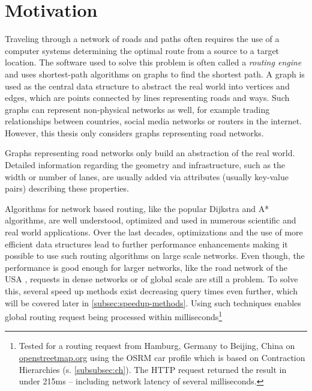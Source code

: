 
\section{Motivation}
	
	Traveling through a network of roads and paths often requires the use of a computer systems determining the optimal route from a source to a target location.
	The software used to solve this problem is often called a \emph{routing engine} and uses shortest-path algorithms on graphs to find the shortest path.
	A graph is used as the central data structure to abstract the real world into vertices and edges, which are points connected by lines representing roads and ways.
	Such graphs can represent non-physical networks as well, for example trading relationships between countries, social media networks or routers in the internet.
	However, this thesis only considers graphs representing road networks.
	
	Graphs representing road networks only build an abstraction of the real world.
	Detailed information regarding the geometry and infrastructure, such as the width or number of lanes, are usually added via attributes (usually key-value pairs) describing these properties.
	
	Algorithms for network based routing, like the popular Dijkstra and A* algorithms, are well understood, optimized and used in numerous scientific and real world applications.
	Over the last decades, optimizations and the use of more efficient data structures lead to further performance enhancements making it possible to use such routing algorithms on large scale networks.
	Even though, the performance is good enough for larger networks, like the road network of the USA \cite{aviram-optimizing-dijkstra}, requests in dense networks or of global scale are still a problem.
	To solve this, several speed up methods exist decreasing query times even further, which will be covered later in \cref{subsec:speedup-methods}.
	Using such techniques enables global routing request being processed within milliseconds\footnote{Tested for a routing request from Hamburg, Germany to Beijing, China on \href{https://www.openstreetmap.org/directions?engine=fossgis\_osrm\_car&route=53.55\%2C10.00\%3B39.91\%2C116.39}{openstreetmap.org} using the OSRM car profile which is based on Contraction Hierarchies (s. \cref{subsubsec:ch}). The HTTP request returned the result in under 215ms -- including network latency of several milliseconds.}
	
